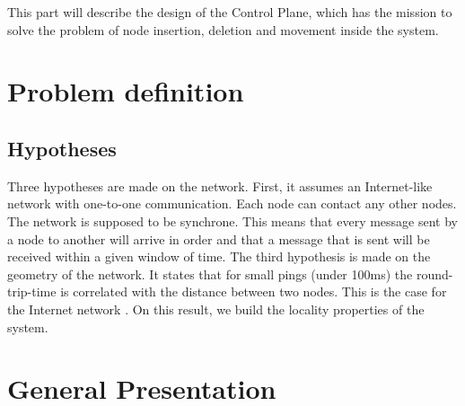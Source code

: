 \documentclass[a4paper,11pt,oneside]{report}
\begin{document}
This part will describe the design of the Control Plane, which has the mission
to solve the problem of node insertion, deletion and movement inside the
system.

\section{Problem definition}

\subsection{Hypotheses}
Three hypotheses are made on the network. First, it
assumes an Internet-like network with one-to-one communication. Each node can contact any other nodes. The network is supposed to be synchrone. This
means that every message sent by a node to another will arrive in order and
that a message that is sent will be received within a given window of time. The
third hypothesis is made on the geometry of the network. It states that for
small pings (under 100ms) the round-trip-time is correlated with the
distance between two nodes. This is the case for the Internet network
\cite{Seibert2014}. On this result, we build the locality properties of the
system. 


\section{General Presentation}
\end{document}
